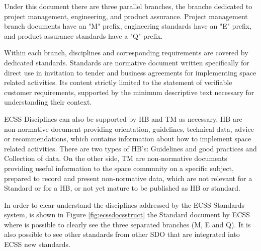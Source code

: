 {Under this document there are three parallel branches, the branche dedicated to project management,
engineering, and product assurance.
Project management branch documents have an "M" prefix, engineering standards have an "E" prefix, and product assurance standards have a "Q" prefix.

Within each branch, disciplines and corresponding requirements are covered by
dedicated standards.
Standards are normative document written specifically for direct use in invitation to tender and 
business agreements for implementing space related activities. Its content 
strictly limited to the statement of verifiable customer requirements, supported 
by the minimum descriptive text necessary for understanding their context.

\ac{ECSS} Disciplines can also be supported by \ac{HB} and \ac{TM} as necessary\cite{ecss-s-st-00c}.
\ac{HB} are non-normative document providing orientation, 
guidelines, technical data, advice or recommendations, which contains 
information about how to implement space related activities. There are two types of \ac{HB}'s: Guidelines and good practices and Collection of data.
On the other side, \ac{TM} are non-normative documents providing useful information to the space community 
on a specific subject, prepared to record and present non-normative data, which 
are not relevant for a Standard or for a \ac{HB}, or not yet mature to be published as \ac{HB} or standard.

In order to clear understand the disciplines addressed by the \ac{ECSS} Standards system,
is shown in Figure \ref{fig:ecssdocsstruct}\cite{ecss-s-st-00c} the Standard document by \ac{ECSS} where is possible to clearly
see the three separated branches (M, E and Q). It is also possible to see other standards from other \ac{SDO} that are integrated into \ac{ECSS} new standards.

\def\a{\save[].[dddddd]!C="a"*[F--]\frm{}\restore}
\def\b{\save[].[dddddddd]!C="b"*[F--]\frm{}\restore}

\def\h{\save[].[rr]!C="h"*+<7pt>+[F:<10pt>]\frm{}\restore}

}
